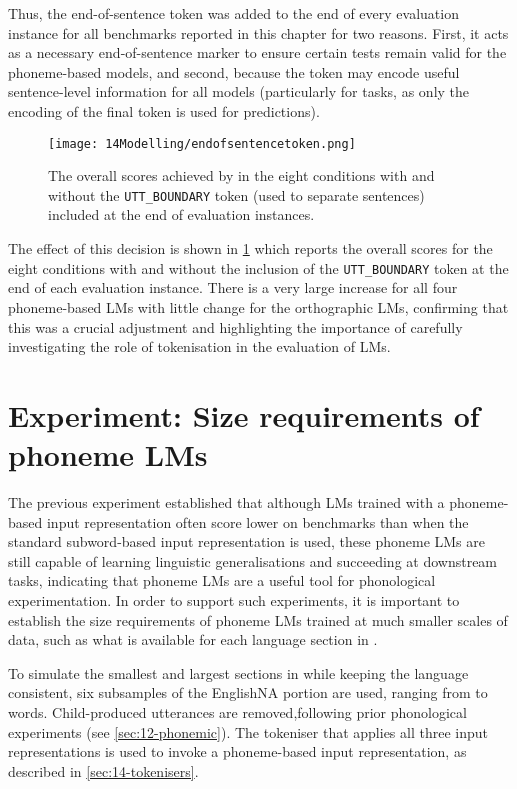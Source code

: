Thus, the end-of-sentence token was added to the end of every evaluation instance for all benchmarks reported in this chapter for two reasons. First, it acts as a necessary end-of-sentence marker to ensure certain tests remain valid for the phoneme-based models, and second, because the token may encode useful sentence-level information for all models (particularly for \glue tasks, as only the encoding of the final token is used for predictions).

\begin{figure}[t]
    \centering
    \texttt{[image: 14Modelling/endofsentencetoken.png]}
    \caption{The overall \blimp scores achieved by \gpt in the eight conditions with and without the \texttt{UTT\_BOUNDARY} token (used to separate sentences) included at the end of evaluation instances.}
    \label{fig:14-endofsentencetoken}
\end{figure}

The effect of this decision is shown in \cref{fig:14-endofsentencetoken} which reports the overall \blimp scores for the eight conditions with and without the inclusion of the \texttt{UTT\_BOUNDARY} token at the end of each evaluation instance. There is a very large increase for all four phoneme-based LMs with little change for the orthographic LMs, confirming that this was a crucial adjustment and highlighting the importance of carefully investigating the role of tokenisation in the evaluation of LMs.

\section{Experiment: Size requirements of phoneme LMs}\label{sec:14-sizerequirements}

The previous experiment established that although LMs trained with a phoneme-based input representation often score lower on benchmarks than when the standard subword-based input representation is used, these phoneme LMs are still capable of learning linguistic generalisations and succeeding at downstream tasks, indicating that phoneme LMs are a useful tool for phonological experimentation. In order to support such experiments, it is important to establish the size requirements of phoneme LMs trained at much smaller scales of data, such as what is available for each language section in \ipachildes.

To simulate the smallest and largest sections in \ipachildes while keeping the language consistent, six subsamples of the EnglishNA portion are used, ranging from  to  words. Child-produced utterances are removed,following prior phonological experiments (see \cref{sec:12-phonemic}). The tokeniser that applies all three input representations is used to invoke a phoneme-based input representation, as described in \cref{sec:14-tokenisers}. 

